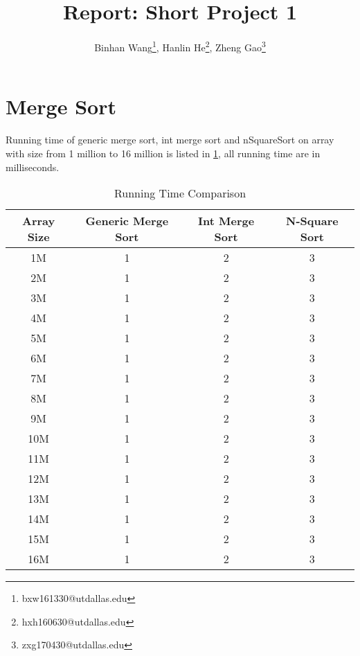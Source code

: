 \documentclass[10pt]{article}
\title{\vspace*{-1em}Report: Short Project 1}
\author{Binhan Wang\footnote{bxw161330@utdallas.edu}, Hanlin He\footnote{hxh160630@utdallas.edu},
Zheng Gao\footnote{zxg170430@utdallas.edu}}
\begin{document}
\maketitle

\section{Merge Sort}

Running time of generic merge sort, int merge sort and nSquareSort on array
with size from 1 million to 16 million is listed in \cref{r1}, all running time
are in milliseconds.

\begin{table}[H]
    \centering
    \caption{Running Time Comparison}\label{r1}
    \begin{tabular}{c|ccc}
        Array Size & Generic Merge Sort & Int Merge Sort & N-Square Sort \\\hline\hline
        1M & 1 & 2 & 3 \\
        2M & 1 & 2 & 3 \\
        3M & 1 & 2 & 3 \\
        4M & 1 & 2 & 3 \\
        5M & 1 & 2 & 3 \\
        6M & 1 & 2 & 3 \\
        7M & 1 & 2 & 3 \\
        8M & 1 & 2 & 3 \\
        9M & 1 & 2 & 3 \\
        10M & 1 & 2 & 3 \\
        11M & 1 & 2 & 3 \\
        12M & 1 & 2 & 3 \\
        13M & 1 & 2 & 3 \\
        14M & 1 & 2 & 3 \\
        15M & 1 & 2 & 3 \\
        16M & 1 & 2 & 3 \\
    \end{tabular}
\end{table}
\end{document}

